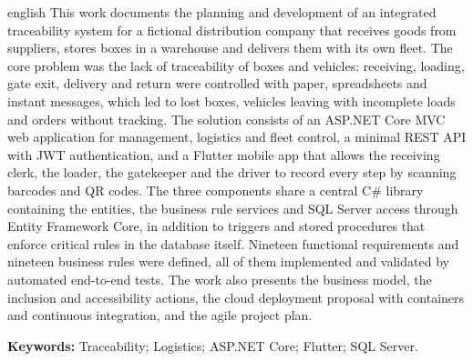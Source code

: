 \begin{resumo}[ABSTRACT]
\begin{otherlanguage*}{english}
\SingleSpacing
This work documents the planning and development of an integrated traceability system for a fictional distribution company that receives goods from suppliers, stores boxes in a warehouse and delivers them with its own fleet. The core problem was the lack of traceability of boxes and vehicles: receiving, loading, gate exit, delivery and return were controlled with paper, spreadsheets and instant messages, which led to lost boxes, vehicles leaving with incomplete loads and orders without tracking. The solution consists of an ASP.NET Core MVC web application for management, logistics and fleet control, a minimal REST API with JWT authentication, and a Flutter mobile app that allows the receiving clerk, the loader, the gatekeeper and the driver to record every step by scanning barcodes and QR codes. The three components share a central C\# library containing the entities, the business rule services and SQL Server access through Entity Framework Core, in addition to triggers and stored procedures that enforce critical rules in the database itself. Nineteen functional requirements and nineteen business rules were defined, all of them implemented and validated by automated end-to-end tests. The work also presents the business model, the inclusion and accessibility actions, the cloud deployment proposal with containers and continuous integration, and the agile project plan.

\vspace{\onelineskip}
\noindent\textbf{Keywords:} Traceability; Logistics; ASP.NET Core; Flutter; SQL Server.
\end{otherlanguage*}
\end{resumo}
